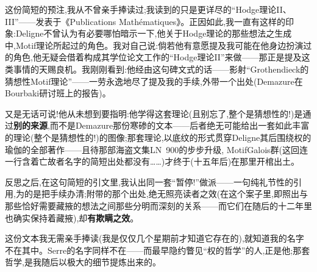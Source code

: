 
这份简短的预注,我从不曾亲手捧读过;我读到的只是更详尽的“Hodge理论II、III”——发表于《Publications Mathématiques》。正因如此,我一直有这样的印象:Deligne不曾认为有必要哪怕暗示一下,他关于Hodge理论的那些想法之生成中,\dmark{}Motif理论所起过的角色。我对自己说:倘若他有意愿提及我可能在他身边扮演过的角色,他无疑会借着构成其学位论文工作的“Hodge理论II”来做——那正是提及这类事情的天赐良机。我刚刚看到:他经由这句碑文式的话——影射“Grothendieck的猜想性Motif理论”——一劳永逸地尽了提及我的手续,外带一个出处(Demazure在Bourbaki研讨班上的报告)。

又是无话可说!他从未想到要指明:他学得这套理论(且别忘了,整个是猜想性的!)是通过\textbf{别的来源},而不是Demazure那份寒碜的文本——后者绝无可能给出一套如此丰富的理论(整个是猜想性的!)的图像;那套理论,以底纹的形式贯穿Deligne其后围绕权的瑜伽的全部著作——且待那部海盗文集LN~900的步步升级, MotifGalois群(这回连一行含着亡故者名字的简短出处都没有……)才终于(十五年后)在那里开棺出土。

反思之后,在这句简短的引文里,我认出同一套“暂停!”做派——一句纯礼节性的引用,为的是把手续办清;附带的那个出处,绝无照亮读者之效(在这个案子里,即照出与那些恰好需要藏掖的想法之间那些分明而深刻的关系\dmark{}——而它们在随后的十二年里也确实保持着藏掖),却\textbf{有欺瞒之效}。


这份文本我无需亲手捧读(我是仅仅几个星期前才知道它存在的),就知道我的名字不在其中。Serre的名字同样不在——而最早隐约瞥见“权的哲学”的人,正是他;那套哲学,是我随后以极大的细节提炼出来的。

